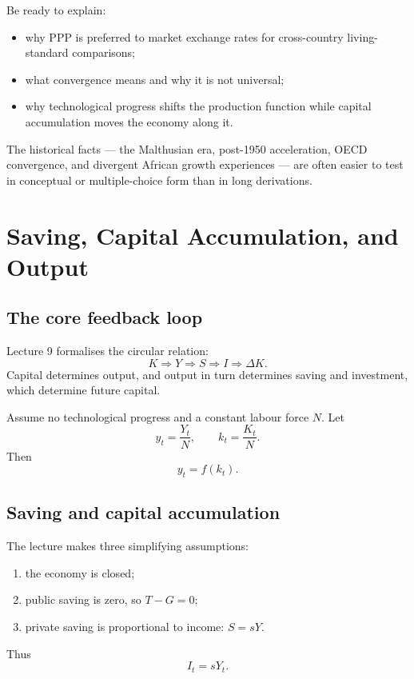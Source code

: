 \documentclass[12pt]{article}
\begin{document}
\begin{examtip}[title={Exam Focus: High priority for short-answer}]
Be ready to explain:
\begin{itemize}[leftmargin=1.5em]
\item why PPP is preferred to market exchange rates for cross-country living-standard comparisons;
\item what convergence means and why it is not universal;
\item why technological progress shifts the production function while capital accumulation moves the economy along it.
\end{itemize}
\end{examtip}

\begin{examtip}[title={Exam Focus: Likely conceptual / recognition}]
The historical facts --- the Malthusian era, post-1950 acceleration, OECD convergence, and divergent African growth experiences --- are often easier to test in conceptual or multiple-choice form than in long derivations.
\end{examtip}

\newpage


\section{Saving, Capital Accumulation, and Output}

\subsection{The core feedback loop}

Lecture 9 formalises the circular relation:
\[
K \Rightarrow Y \Rightarrow S \Rightarrow I \Rightarrow \Delta K.
\]
Capital determines output, and output in turn determines saving and investment, which determine future capital.

Assume no technological progress and a constant labour force $N$. Let
\[
y_t=\frac{Y_t}{N},\qquad k_t=\frac{K_t}{N}.
\]
Then
\[
y_t=f(k_t).
\]

\subsection{Saving and capital accumulation}

The lecture makes three simplifying assumptions:
\begin{enumerate}[leftmargin=1.5em]
\item the economy is closed;
\item public saving is zero, so $T-G=0$;
\item private saving is proportional to income: $S=sY$.
\end{enumerate}
Thus
\[
I_t=sY_t.
\]
\end{document}
